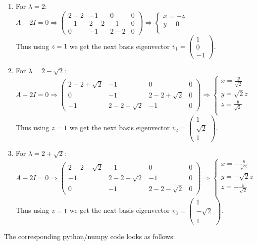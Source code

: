 \documentclass{article}
\begin{document}
	\begin{enumerate}
		\item For $\lambda=2$:\\
		$
		A-2I=0 \Rightarrow
		\left(\begin{array}{ccc|c}
		2-2 & -1 & 0 & 0 \\ 
		-1 & 2-2 & -1 & 0\\ 
		0 & -1 & 2-2 & 0
		\end{array}\right)
		\Rightarrow \left\{
		\begin{array}{cc}
		x=-z\\
		y=0\\
		\end{array}\right.
		$\\
		Thus using $z=1$ we get the next basis eigenvector $v_1=\begin{pmatrix}1 \\0\\ -1\end{pmatrix}$.

		\item For $\lambda=2-\sqrt{2}$:\\
		$
		A-2I=0 \Rightarrow
		\left(\begin{array}{ccc|c}
		2-2+\sqrt{2} & -1 & 0 & 0 \\
		0 & -1 & 2-2+\sqrt{2} & 0 \\
		-1 & 2-2+\sqrt{2} & -1 & 0 
		\end{array}\right)
		\Rightarrow \left\{
		\begin{array}{cc}
		x=\frac{y}{\sqrt{2}}\\
		y=\sqrt{2}z\\
		z=\frac{y}{\sqrt{2}}\\
		\end{array}\right.
		$\\
		Thus using $z=1$ we get the next basis eigenvector $v_2=\begin{pmatrix}1 \\\sqrt{2}\\ 1\end{pmatrix}$.
		
		\item For $\lambda=2+\sqrt{2}$:\\
		$
		A-2I=0 \Rightarrow
		\left(\begin{array}{ccc|c}
		2-2-\sqrt{2} & -1 & 0 & 0 \\ 
		-1 & 2-2-\sqrt{2} & -1 & 0\\ 
		0 & -1 & 2-2-\sqrt{2} & 0
		\end{array}\right)
		\Rightarrow \left\{
		\begin{array}{cc}
		x=-\frac{y}{\sqrt{2}}\\
		y=-\sqrt{2}z\\
		z=-\frac{y}{\sqrt{2}}\\
		\end{array}\right.
		$\\
		Thus using $z=1$ we get the next basis eigenvector $v_3=\begin{pmatrix}1 \\-\sqrt{2} \\ 1\end{pmatrix}$.
	\end{enumerate}
	The corresponding python/numpy code looks as follows:\\
	
\end{document}
